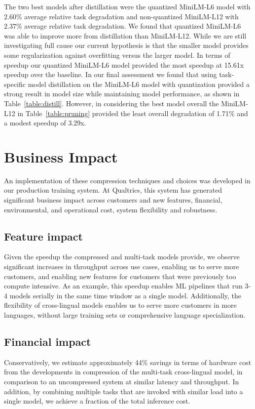 \documentclass[letterpaper]{article} %
\begin{document}
The two best models after distillation were the quantized MiniLM-L6 model with $2.60$\% average relative task degradation and non-quantized MiniLM-L12 with $2.37$\% average relative task degradation.
We found that quantized MiniLM-L6 was able to improve more from distillation than MiniLM-L12.
While we are still investigating full cause our current hypothesis is that the smaller model provides some regularization against overfitting versus the larger model.
In terms of speedup our quantized MiniLM-L6 model provided the most speedup at 15.61x speedup over the baseline.
In our final assessment we found that using task-specific model distillation on the MiniLM-L6 model with quantization provided a strong result in model size while maintaining model performance, as shown in Table~\ref{table:distill}.
However, in considering the best model overall the MiniLM-L12 in Table~\ref{table:pruning} provided the least overall degradation of 1.71\% and a modest speedup of 3.29x.

\section*{Business Impact}
An implementation of these compression techniques and choices was developed in our production training system.
At Qualtrics, this system has generated significant business impact across customers and new features, financial, environmental, and operational cost, system flexibility and robustness.

\subsection*{Feature impact}
Given the speedup the compressed and multi-task models provide, we observe significant increases in throughput across use cases, enabling us to serve more customers, and enabling new features for customers that were previously too compute intensive.
As an example, this speedup enables ML pipelines that run 3-4 models serially in the same time window as a single model.
Additionally, the flexibility of cross-lingual models enables us to serve more customers in more languages, without large training sets or comprehensive language specialization.

\subsection*{Financial impact}
Conservatively, we estimate approximately 44\% savings in terms of hardware cost from the developments in compression of the multi-task cross-lingual model, in comparison to an uncompressed system at similar latency and throughput.
In addition, by combining multiple tasks that are invoked with similar load into a single model, we achieve a fraction of the total inference cost.
\end{document}
